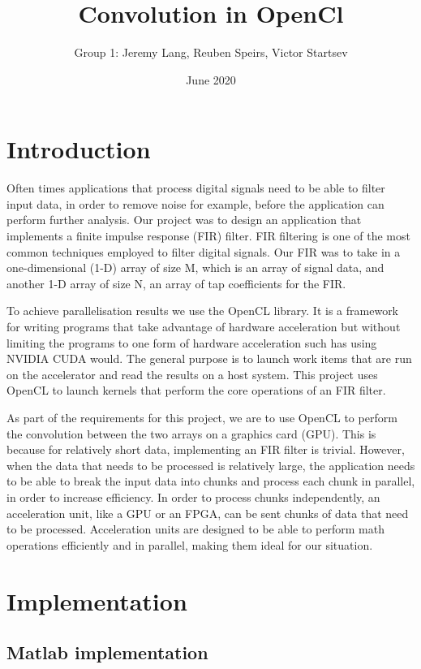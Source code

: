 \documentclass{article}
\title{Convolution in OpenCl}
\author{Group 1: Jeremy Lang, Reuben Speirs, Victor Startsev}
\date{June 2020}
\begin{document}
\maketitle

\section{Introduction}

Often times applications that process digital signals need to be able to filter input data, in order to remove noise for example, before the application can perform further analysis. Our project was to design an application that implements a finite impulse response (FIR) filter. FIR filtering is one of the most common techniques employed to filter digital signals. Our FIR was to take in a one-dimensional (1-D) array of size M, which is an array of signal data, and another 1-D array of size N, an array of tap coefficients for the FIR. 

To achieve parallelisation results we use the OpenCL library. It is a framework for writing programs that take advantage of hardware acceleration but without limiting the programs to one form of hardware acceleration such has using NVIDIA CUDA would. The general purpose is to launch work items that are run on the accelerator and read the results on a host system. This project uses OpenCL to launch kernels that perform the core operations of an FIR filter.

As part of the requirements for this project, we are to use OpenCL to perform the convolution between the two arrays on a graphics card (GPU). This is because for relatively short data, implementing an FIR filter is trivial. However, when the data that needs to be processed is relatively large, the application needs to be able to break the input data into chunks and process each chunk in parallel, in order to increase efficiency. In order to process chunks independently, an acceleration unit, like a GPU or an FPGA, can be sent chunks of data that need to be processed. Acceleration units are designed to be able to perform math operations efficiently and in parallel, making them ideal for our situation.

\section{Implementation}

\subsection{Matlab implementation}
\end{document}
